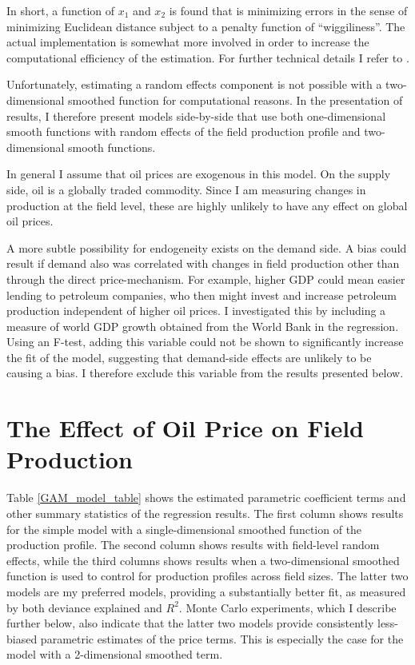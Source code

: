 \documentclass[12pt]{article}
\begin{document}
In short, a function of $x_1$ and $x_2$ is found that is minimizing errors in the sense of minimizing Euclidean distance subject to a penalty function of “wiggiliness”.  The actual implementation is somewhat more involved in order to increase the computational efficiency of the estimation.  For further technical details I refer to \citet{wood_thin_2003}. 

Unfortunately, estimating a random effects component is not possible with a two-dimensional smoothed function for computational reasons.  In the presentation of results, I therefore present models side-by-side that use both one-dimensional smooth functions with random effects of the field production profile and two-dimensional smooth functions.

In general I assume that oil prices are exogenous in this model. On the supply side, oil is a globally traded commodity.  Since I am measuring changes in production at the field level, these are highly unlikely to have any effect on global oil prices.

A more subtle possibility for endogeneity exists on the demand side. A bias could result if demand also was correlated with changes in field production other than through the direct price-mechanism. For example, higher GDP could mean easier lending to petroleum companies, who then might invest and increase petroleum production independent of higher oil prices. I investigated this by including a measure of world GDP growth obtained from the World Bank in the regression. Using an F-test, adding this variable could not be shown to significantly increase the fit of the model, suggesting that demand-side effects are unlikely to be causing a bias. I therefore exclude this variable from the results presented below.

\section{The Effect of Oil Price on Field Production}

Table \ref{GAM_model_table} shows the estimated parametric coefficient terms and other summary statistics of the regression results.  The first column shows results for the simple model with a single-dimensional smoothed function of the production profile.  The second column shows results with field-level random effects, while the third columns shows results when a two-dimensional smoothed function is used to control for production profiles across field sizes. The latter two models are my preferred models, providing a substantially better fit, as measured by both deviance explained and $R^2$. Monte Carlo experiments, which I describe further below, also indicate that the latter two models provide consistently less-biased parametric estimates of the price terms. This is especially the case for the model with a 2-dimensional smoothed term.
\end{document}

